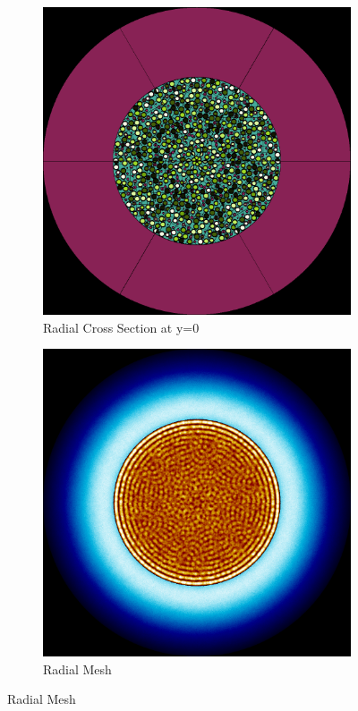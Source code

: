 \begin{figure}[h!]
\centering

\begin{subfigure}{0.45\textwidth}
  \includegraphics[width=0.95\linewidth]{figures/0-60/0-60-r}
  \caption{Radial Cross Section at y=0}
  \label{fig:0-60-r}
\end{subfigure}%
%
\begin{subfigure}{0.45\textwidth}
  \includegraphics[width=0.95\linewidth]{figures/0-60/0-60-rm}
  \caption{Radial Mesh}
  \label{fig:0-60-rm}
\end{subfigure}


\end{figure}
